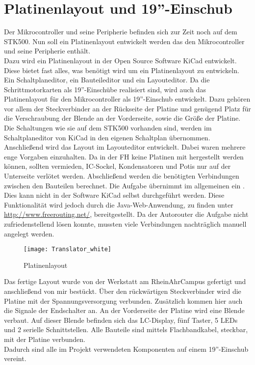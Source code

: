 \section{Platinenlayout und 19''-Einschub}
\label{sec:Platinenlayout}
Der Mikrocontroller und seine Peripherie befinden sich zur Zeit noch auf dem STK500. Nun soll ein Platinenlayout entwickelt werden das den Mikrocontroller und seine Peripherie enthält.\\
Dazu wird ein Platinenlayout in der Open Source Software KiCad entwickelt. Diese bietet fast alles, was benötigt wird um ein Platinenlayout zu entwickeln. Ein Schaltplaneditor, ein Bauteileditor und ein Layouteditor. Da die Schrittmotorkarten als 19''-Einschübe realisiert sind, wird auch das Platinenlayout für den Mikrocontroller als 19''-Einschub entwickelt. Dazu gehören vor allem der Steckverbinder an der Rückseite der Platine und genügend Platz für die Verschraubung der Blende an der Vorderseite, sowie die Größe der Platine. Die Schaltungen wie sie auf dem STK500 vorhanden sind, werden im Schaltplaneditor von KiCad in den eigenen Schaltplan übernommen. Anschließend wird das Layout im Layouteditor entwickelt. Dabei waren mehrere enge Vorgaben einzuhalten. Da in der FH keine Platinen mit  hergestellt werden können, sollten  vermieden, IC-Sockel, Kondensatoren und Potis nur auf der Unterseite verlötet werden. Abschließend werden die benötigten Verbindungen zwischen den Bauteilen berechnet. Die Aufgabe übernimmt im allgemeinen ein . Dies kann nicht in der Software KiCad selbst durchgeführt werden. Diese Funktionalität wird jedoch durch die Java-Web-Anwendung, zu finden unter  \url{http://www.freerouting.net/}, bereitgestellt. Da der Autorouter die Aufgabe nicht zufriedenstellend lösen konnte, mussten viele Verbindungen nachträglich manuell angelegt werden. 
\begin{figure}[htb]
\centering
\texttt{[image: Translator\_white]}
\caption{Platinenlayout}
\label{fig:Platine}
\end{figure}
Das fertige Layout wurde von der Werkstatt am RheinAhrCampus gefertigt und anschließend von mir bestückt. Über den rückwärtigen Steckverbinder wird die Platine mit der Spannungsversorgung verbunden. Zusätzlich kommen hier auch die Signale der Endschalter an. An der Vorderseite der Platine wird eine Blende verbaut. Auf dieser Blende befinden sich das LC-Display, fünf Taster, 5 LEDs und 2 serielle Schnittstellen. Alle Bauteile sind mittels Flachbandkabel, steckbar, mit der Platine verbunden. \\
Dadurch sind alle im Projekt verwendeten Komponenten auf einem 19''-Einschub vereint.

